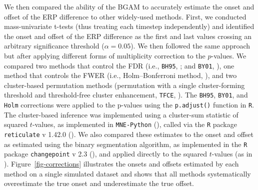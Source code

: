 \documentclass[
  doc,
  floatsintext,
  longtable,
  a4paper,
  nolmodern,
  notxfonts,
  notimes,
  donotrepeattitle,
  colorlinks=true,linkcolor=blue,citecolor=blue,urlcolor=blue]{apa7}
\begin{document}
We then compared the ability of the BGAM to accurately estimate the
onset and offset of the ERP difference to other widely-used methods.
First, we conducted mass-univariate t-tests (thus treating each timestep
independently) and identified the onset and offset of the ERP difference
as the first and last values crossing an arbitrary significance
threshold (\(\alpha = 0.05\)). We then followed the same approach but
after applying different forms of multiplicity correction to the
\(p\)-values. We compared two methods that control the FDR (i.e.,
\texttt{BH95}, ; and \texttt{BY01}, ), one method that controls the FWER (i.e.,
Holm--Bonferroni method, ), and two
cluster-based permutation methods (permutation with a single
cluster-forming threshold and threshold-free cluster enhancement,
\texttt{TFCE}, ). The
\texttt{BH95}, \texttt{BY01}, and \texttt{Holm} corrections were applied
to the p-values using the \texttt{p.adjust()} function in \texttt{R}.
The cluster-based inference was implemented using a cluster-sum
statistic of squared \(t\)-values, as implemented in \texttt{MNE-Python}
(), called via the \texttt{R}
package \texttt{reticulate} v 1.42.0 (). We also compared these estimates to the onset and offset as
estimated using the binary segmentation algorithm, as implemented in the
\texttt{R} package \texttt{changepoint} v 2.3
(), and applied directly
to the squared \(t\)-values (as in
).
Figure~\ref{fig-corrections} illustrates the onsets and offsets
estimated by each method on a single simulated dataset and shows that
all methods systematically overestimate the true onset and underestimate
the true offset.
\end{document}
